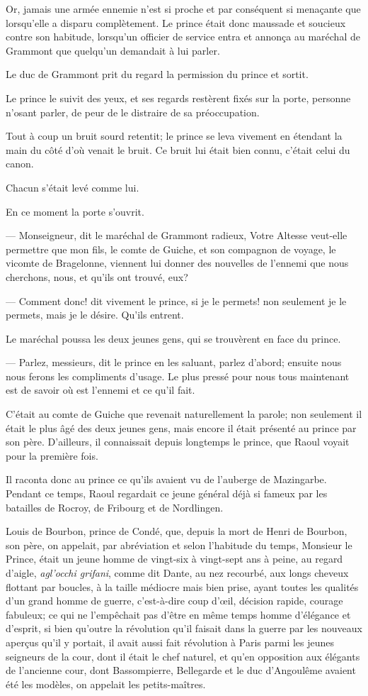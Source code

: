 Or, jamais une armée ennemie n'est si proche et par conséquent si menaçante que lorsqu'elle a disparu complètement. Le prince était donc maussade et soucieux contre son habitude, lorsqu'un officier de service entra et annonça au maréchal de Grammont que quelqu'un demandait à lui parler.

Le duc de Grammont prit du regard la permission du prince et sortit.

Le prince le suivit des yeux, et ses regards restèrent fixés sur la porte, personne n'osant parler, de peur de le distraire de sa préoccupation.

Tout à coup un bruit sourd retentit; le prince se leva vivement en étendant la main du côté d'où venait le bruit. Ce bruit lui était bien connu, c'était celui du canon.

Chacun s'était levé comme lui.

En ce moment la porte s'ouvrit.

— Monseigneur, dit le maréchal de Grammont radieux, Votre Altesse veut-elle permettre que mon fils, le comte de Guiche, et son compagnon de voyage, le vicomte de Bragelonne, viennent lui donner des nouvelles de l'ennemi que nous cherchons, nous, et qu'ils ont trouvé, eux?

— Comment donc! dit vivement le prince, si je le permets! non seulement je le permets, mais je le désire. Qu'ils entrent.

Le maréchal poussa les deux jeunes gens, qui se trouvèrent en face du prince.

— Parlez, messieurs, dit le prince en les saluant, parlez d'abord; ensuite nous nous ferons les compliments d'usage. Le plus pressé pour nous tous maintenant est de savoir où est l'ennemi et ce qu'il fait.

C'était au comte de Guiche que revenait naturellement la parole; non seulement il était le plus âgé des deux jeunes gens, mais encore il était présenté au prince par son père. D'ailleurs, il connaissait depuis longtemps le prince, que Raoul voyait pour la première fois.

Il raconta donc au prince ce qu'ils avaient vu de l'auberge de Mazingarbe.
Pendant ce temps, Raoul regardait ce jeune général déjà si fameux par les batailles de Rocroy, de Fribourg et de Nordlingen.

Louis de Bourbon, prince de Condé, que, depuis la mort de Henri de Bourbon, son père, on appelait, par abréviation et selon l'habitude du temps, Monsieur le Prince, était un jeune homme de vingt-six à vingt-sept ans à peine, au regard d'aigle, \textit{agl'occhi grifani}, comme dit Dante, au nez recourbé, aux longs cheveux flottant par boucles, à la taille médiocre mais bien prise, ayant toutes les qualités d'un grand homme de guerre, c'est-à-dire coup d'œil, décision rapide, courage fabuleux; ce qui ne l'empêchait pas d'être en même temps homme d'élégance et d'esprit, si bien qu'outre la révolution qu'il faisait dans la guerre par les nouveaux aperçus qu'il y portait, il avait aussi fait révolution à Paris parmi les jeunes seigneurs de la cour, dont il était le chef naturel, et qu'en opposition aux élégants de l'ancienne cour, dont Bassompierre, Bellegarde et le duc d'Angoulême avaient été les modèles, on appelait les petits-maîtres.

